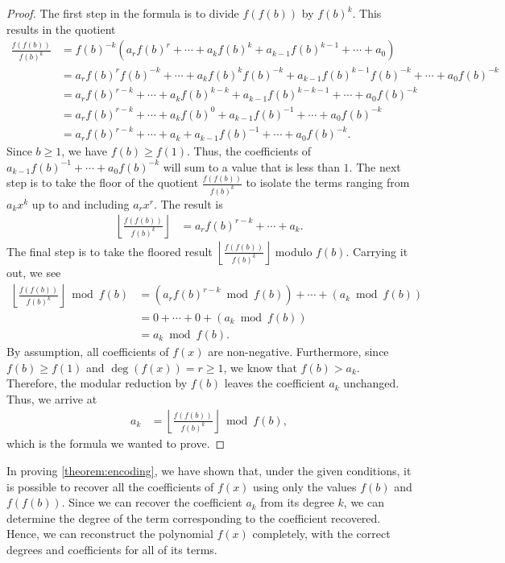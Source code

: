 \documentclass[10pt,a4paper]{article}
\theoremstyle{plain}
\newcommand{\floor}[1]{\left\lfloor #1 \right\rfloor}
\begin{document}
\begin{proof}
The first step in the formula is to divide $f(f(b))$ by $f(b)^k$. This results in the quotient
\begin{align*}
\frac{f(f(b))}{f(b)^k} &= f(b)^{-k} (a_r f(b)^r  + \cdots + a_k f(b)^k + a_{k-1} f(b)^{k-1} + \cdots + a_0) \\
&= a_r f(b)^r f(b)^{-k} + \cdots + a_{k} f(b)^{k} f(b)^{-k} + a_{k-1} f(b)^{k-1} f(b)^{-k} + \cdots + a_0 f(b)^{-k} \\
&= a_r f(b)^{r-k} + \cdots + a_{k} f(b)^{k-k} + a_{k-1} f(b)^{k-k-1} + \cdots + a_0 f(b)^{-k}  \\
&= a_r f(b)^{r-k} + \cdots + a_{k} f(b)^{0} + a_{k-1} f(b)^{-1} + \cdots + a_0 f(b)^{-k}  \\
&= a_r f(b)^{r-k} + \cdots + a_{k} + a_{k-1} f(b)^{-1} + \cdots + a_0 f(b)^{-k} .
\end{align*}
Since $b \geq 1$, we have $f(b) \geq f(1)$. Thus, the coefficients of $a_{k-1} f(b)^{-1} + \cdots + a_0 f(b)^{-k}$ will sum to a value that is less than $1$. The next step is to take the floor of the quotient $\frac{f(f(b))}{f(b)^k}$ to isolate the terms ranging from $a_k x^k$ up to and including $a_r x^r$. The result is
\begin{align*}
\floor{\frac{f(f(b))}{f(b)^k}} &= a_r f(b)^{r-k} + \cdots + a_{k} .
\end{align*}
The final step is to take the floored result $\floor{\frac{f(f(b))}{f(b)^k}}$ modulo $f(b)$. Carrying it out, we see
\begin{align*}
\floor{\frac{f(f(b))}{f(b)^k}} \bmod{f(b)} &= (a_r f(b)^{r-k} \bmod{f(b)}) + \cdots + (a_k \bmod{f(b)}) \\
&= 0 + \cdots + 0 + (a_k \bmod{f(b)}) \\
&= a_k \bmod{f(b)} .
\end{align*}
By assumption, all coefficients of $f(x)$ are non-negative. Furthermore, since $f(b) \geq f(1)$ and $\deg(f(x)) = r \geq 1$, we know that $f(b) > a_k$. Therefore, the modular reduction by $f(b)$ leaves the coefficient $a_k$ unchanged. Thus, we arrive at
\begin{align*}
a_k &= \floor{\frac{f(f(b))}{f(b)^k}} \bmod{f(b)} ,
\end{align*}
which is the formula we wanted to prove.
\end{proof}

In proving \cref{theorem:encoding}, we have shown that, under the given conditions, it is possible to recover all the coefficients of $f(x)$ using only the values $f(b)$ and $f(f(b))$. Since we can recover the coefficient $a_k$ from its degree $k$, we can determine the degree of the term corresponding to the coefficient recovered. Hence, we can reconstruct the polynomial $f(x)$ completely, with the correct degrees and coefficients for all of its terms.
\end{document}

